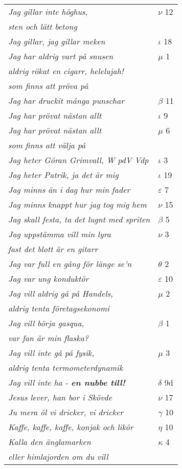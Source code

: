 \documentclass[a6paper,10pt]{article}
\begin{document}
\newpage
\begin{table}[!h]
\begin{tabular}{l l}
\textit{Jag gillar inte höghus,}	&$\nu$ 12\\
\textit{sten och lätt betong} &\\
\textit{Jag gillar, jag gillar meken} &$\iota$ 18\\
\textit{Jag har aldrig vart på snusen}	&$\mu$ 1\\
\textit{aldrig rökat en cigarr, helelujah!} &\\
\textit{som finns att pröva på} &\\
\textit{Jag har druckit många punschar}	&$\beta$ 11\\
\textit{Jag har prövat nästan allt}	&$\iota$ 9\\
\textit{Jag har prövat nästan allt }	&$\mu$ 6\\
\textit{som finns att välja på} &\\
\textit{Jag heter Göran Grimvall, W pdV Vdp}	&$\iota$ 3\\
\textit{Jag heter Patrik, ja det är mig}&$\iota$ 19\\
\textit{Jag minns än i dag hur min fader}	&$\varepsilon$ 7\\
\textit{Jag minns knappt hur jag tog mig hem}	&$\nu$ 15\\
\textit{Jag skall festa, ta det lugnt med spriten}	&$\beta$ 5\\
\textit{Jag uppstämma vill min lyra}	&$\nu$ 3\\
\textit{fast det blott är en gitarr} &\\
\textit{Jag var full en gång för länge se'n}	&$\theta$ 2\\
\textit{Jag var ung konduktör}	&$\varepsilon$ 10\\
\textit{Jag vill aldrig gå på Handels,}	&$\mu$ 2\\
\textit{aldrig tenta företagsekonomi} &\\
\textit{Jag vill börja gasqua,}	&$\beta$ 1\\
\textit{var fan är min flaska?} &\\
\textit{Jag vill inte gå på fysik,}	&$\mu$ 3\\
\textit{aldrig tenta termometerdynamik} &\\
\textit{Jag vill inte ha - \textbf{en nubbe till!}}	&$\delta$ 9d\\
\textit{Jesus lever, han bor i Skövde} &$\nu$ 17\\
\textit{Ju mera öl vi dricker, vi dricker}	&$\gamma$ 10\\
\textit{Kaffe, kaffe, kaffe, konjak och likör}	&$\eta$ 10\\
\textit{Kalla den änglamarken}	&$\kappa$ 4\\
\textit{eller himlajorden om du vill} &\\
\end{tabular}
\end{table}
\end{document}
